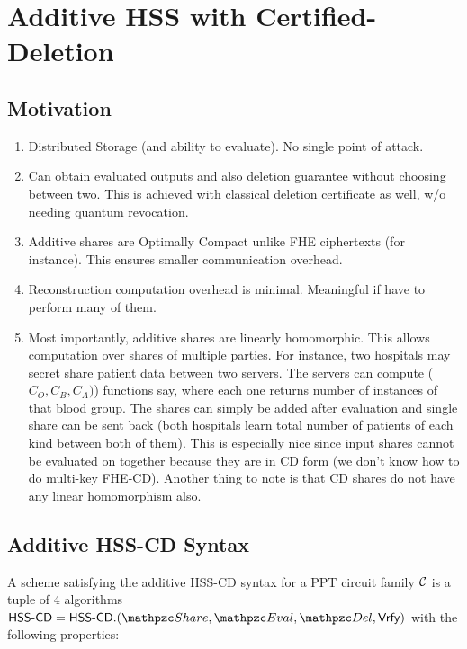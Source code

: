 \section{Additive HSS with Certified-Deletion}

\subsection{Motivation}

\begin{enumerate}
\item Distributed Storage (and ability to evaluate). No single point
of attack.
\item Can obtain evaluated outputs and also deletion guarantee
without choosing between two. This is achieved with classical
deletion certificate as well, w/o needing quantum revocation.
\item Additive shares are Optimally Compact unlike FHE ciphertexts
    (for instance). This ensures smaller communication overhead.
\item Reconstruction computation overhead is minimal. Meaningful if
    have to perform many of them.
\item Most importantly, additive shares are linearly homomorphic.
    This allows computation over shares of multiple parties. For
    instance, two hospitals may secret share patient data between
    two servers. The servers can compute ($C_O, C_B, C_A)$)
    functions say, where each one returns number of instances of
    that blood group. The shares can simply be added after
    evaluation and single share can be sent back (both hospitals
    learn total number of patients of each kind between both of
    them). This is especially nice since input shares cannot be
    evaluated on together because they are in CD form (we don't know
    how to do multi-key FHE-CD). Another thing to note is that CD
    shares do not have any linear homomorphism also.
\end{enumerate}

\subsection{Additive HSS-CD Syntax}

A scheme satisfying the additive HSS-CD syntax for a PPT circuit
family $\mathcal{C}$ is a tuple of 4 algorithms $\HSScd = \HSScd.(\Sh,
\Ev, \Del, \Vrfy)$ with the following properties:

